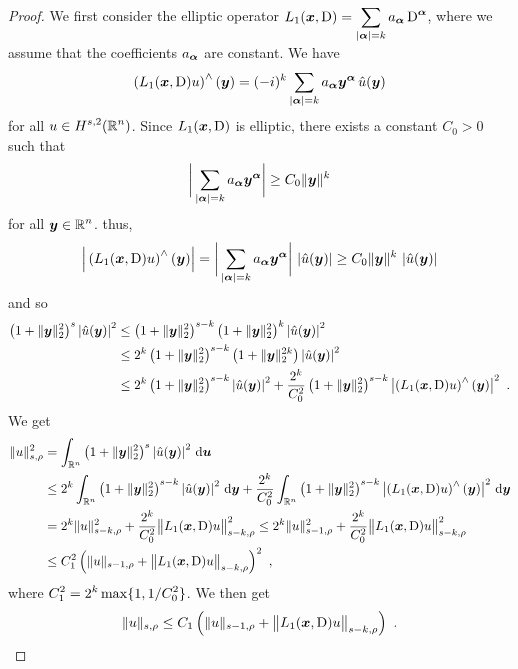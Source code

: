 \begin{proof}
 We first consider the elliptic operator
$\displaystyle L_1({\bm{x}},\operatorname{D}) = \sum_{|{\bm{\alpha}}|= k}
a_{{\bm{\alpha}}} \operatorname{D}^{{\bm{\alpha}}}$,
where we assume that the coefficients $a_{{\bm{\alpha}}}$ are constant.  We
have
\[
 \left(L_1({\bm{x}},\operatorname{D}) u \right)^\wedge({\bm{y}})
= (-i)^k \sum_{|{\bm{\alpha}}|= k} a_{{\bm{\alpha}}} {\bm{y}}^{{\bm{\alpha}}} \,
\hat{u}({\bm{y}})
\]
for all $\displaystyle u \in H^{s,2}(\mathbb{R}^n)$.  Since
$L_1({\bm{x}},\operatorname{D})$ is elliptic, there exists a constant $C_0>0$ such that
\[
\bigg|\sum_{|{\bm{\alpha}}|= k} a_{{\bm{\alpha}}}
{\bm{y}}^{{\bm{\alpha}}}\bigg| \geq  C_0 \|{\bm{y}}\|^k
\]
for all $\displaystyle {\bm{y}} \in \mathbb{R}^n$.  thus,
\[
 \Big| \left(L_1({\bm{x}},\operatorname{D}) u \right)^\wedge({\bm{y}}) \Big|
= \bigg|\sum_{|{\bm{\alpha}}|= k} a_{{\bm{\alpha}}} {\bm{y}}^{{\bm{\alpha}}}\bigg| \,
\left|\hat{u}({\bm{y}})\right|
\geq C_0 \|{\bm{y}}\|^k \, \left|\hat{u}({\bm{y}})\right|
\]
and so
\begin{align*}
\left(1 + \|{\bm{y}}\|_2^2\right)^s \left| \hat{u}({\bm{y}})\right|^2
&\leq \left(1 + \|{\bm{y}}\|_2^2\right)^{s-k}
\left(1 + \|{\bm{y}}\|_2^2\right)^k \left| \hat{u}({\bm{y}})\right|^2 \\
&\leq 2^k \left(1 + \|{\bm{y}}\|_2^2\right)^{s-k}
\left(1 + \|{\bm{y}}\|_2^{2k}\right) \left| \hat{u}({\bm{y}})\right|^2 \\
&\leq 2^k \left(1 + \|{\bm{y}}\|_2^2\right)^{s-k}
\left| \hat{u}({\bm{y}})\right|^2
+ \frac{2^k}{C_0^2} \left(1 + \|{\bm{y}}\|_2^2\right)^{s-k}
\left| \left(L_1({\bm{x}},\operatorname{D}) u\right)^\wedge({\bm{y}})\right|^2 \ .
\end{align*}
We get
\begin{align*}
\|u\|_{s,\rho}^2
&= \int_{\mathbb{R}^n}\left(1 + \|{\bm{y}}\|_2^2\right)^s
\left| \hat{u}({\bm{y}})\right|^2 \,\mathrm{d}{{\bm{u}}} \\
&\leq 2^k \int_{\mathbb{R}^n}
\left(1 + \|{\bm{y}}\|_2^2\right)^{s-k}
\left| \hat{u}({\bm{y}})\right|^2 \,\mathrm{d}{{\bm{y}}}
+ \frac{2^k}{C_0^2} \int_{\mathbb{R}^n} \left(1 + \|{\bm{y}}\|_2^2\right)^{s-k}
\left| \left(L_1({\bm{x}},\operatorname{D}) u\right)^\wedge({\bm{y}})\right|^2
\,\mathrm{d}{{\bm{y}}} \\
&= 2^k \|u\|_{s-k,\rho}^2
+ \frac{2^k}{C_0^2} \big\|L_1({\bm{x}},\operatorname{D})u\big\|_{s-k,\rho}^2
\leq 2^k \|u\|_{s-1,\rho}^2
+ \frac{2^k}{C_0^2} \big\|L_1({\bm{x}},\operatorname{D})u\big\|_{s-k,\rho}^2 \\
&\leq C_1^2 \left( \|u\|_{s-1,\rho} +
\big\|L_1({\bm{x}},\operatorname{D})u\big\|_{s-k,\rho}\right)^2 \ ,
\end{align*}
where $\displaystyle C_1^2 = 2^k \max\{1,1/C_0^2\}$.  We then get
\begin{equation} \label{ellRegInEq1}
\|u\|_{s,\rho} \leq C_1 \left( \|u\|_{s-1,\rho} +
\big\|L_1({\bm{x}},\operatorname{D})u\big\|_{s-k,\rho}\right) \ .
\end{equation}


\end{proof}
